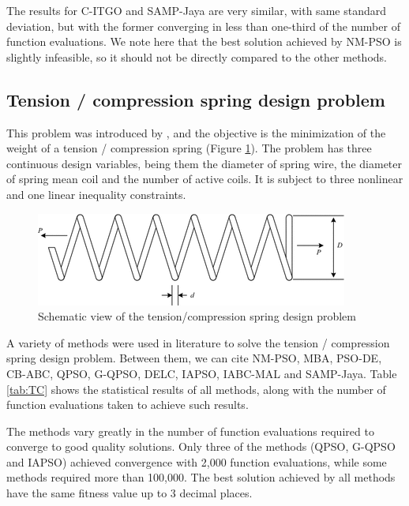 

The results for C-ITGO and SAMP-Jaya are very similar, with same standard deviation, but with the former converging in less than one-third of the number of function evaluations. We note here that the best solution achieved by NM-PSO is slightly infeasible, so it should not be directly compared to the other methods.




\subsection{Tension / compression spring design problem}

This problem was introduced by \cite{TC}, and the objective is the minimization of the weight of a tension / compression spring (Figure \ref{fig:TC}). The problem has three continuous design variables, being them the diameter of spring wire, the diameter of spring mean coil and the number of active coils. It is subject to three nonlinear and one linear inequality constraints.

\begin{figure}[h]
\begin{center}
\includegraphics[scale=0.6]{Imgs/TC.png}
\end{center}
\captionsetup{justification=centering}
\caption{Schematic view of the tension/compression spring design problem}\label{fig:TC}
\end{figure}


A variety of methods were used in literature to solve the tension / compression spring design problem. Between them, we can cite NM-PSO, MBA, PSO-DE, CB-ABC, QPSO, G-QPSO, DELC, IAPSO, IABC-MAL and SAMP-Jaya. Table \ref{tab:TC} shows the statistical results of all methods, along with the number of function evaluations taken to achieve such results.




The methods vary greatly in the number of function evaluations required to converge to good quality solutions. Only three of the methods (QPSO, G-QPSO and IAPSO) achieved convergence with 2,000 function evaluations, while some methods required more than 100,000. The best solution achieved by all methods have the same fitness value up to 3 decimal places.
 
